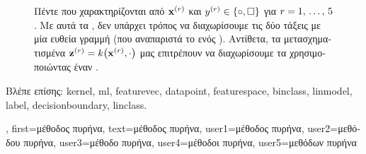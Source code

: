 {{\begin{figure}[H]
\begin{center}
		\end{center}
		{
		\caption{\foreignlanguage{greek}{Πέντε}  \foreignlanguage{greek}{που χαρακτηρίζονται από} 
			 ${\bf x}^{(r)}$ \foreignlanguage{greek}{και} 
			 $y^{(r)} \in \{ \circ, \square \}$ \foreignlanguage{greek}{για $r=1, \,\ldots, \,5$. 
			Με αυτά τα} , \foreignlanguage{greek}{δεν υπάρχει τρόπος να διαχωρίσουμε τις δύο τάξεις  
			με μία ευθεία γραμμή (που αναπαριστά το}  \foreignlanguage{greek}{ενός} ). 
			\foreignlanguage{greek}{Αντίθετα, τα μετασχηματισμένα}  
			${\bf z}^{(r)} = k\big({\bf x}^{(r)},\cdot\big)$ 
			\foreignlanguage{greek}{μας επιτρέπουν να διαχωρίσουμε τα}  \foreignlanguage{greek}{χρησιμοποιώντας 
			έναν} .  \label{fig_linsep_kernel_dict}} }
		\end{figure}
		\foreignlanguage{greek}{Βλέπε επίσης:} \gls{kernel}, \gls{ml}, \gls{featurevec}, \gls{datapoint}, \gls{featurespace}, \gls{binclass}, 
		\gls{linmodel}, \gls{label}, \gls{decisionboundary}, \gls{linclass}.},
	first={\foreignlanguage{greek}{μέθοδος πυρήνα}},
	text={\foreignlanguage{greek}{μέθοδος πυρήνα}},
	user1={\foreignlanguage{greek}{μέθοδος πυρήνα}}, %
	user2={\foreignlanguage{greek}{μεθόδου πυρήνα}}, %
	user3={\foreignlanguage{greek}{μέθοδο πυρήνα}}, %
	user4={\foreignlanguage{greek}{μέθοδοι πυρήνα}}, %
	user5={\foreignlanguage{greek}{μεθόδων πυρήνα}} %
}

